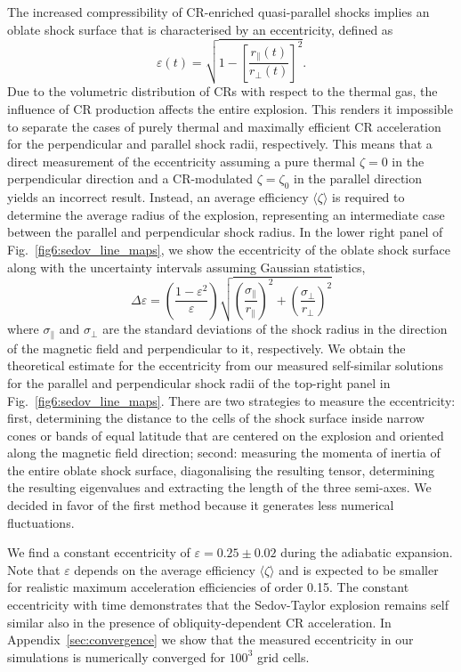 \documentclass[8pt,a4paper,usenatbib]{mnras}
\renewcommand{\epsilon}{\varepsilon}
\begin{document}
The increased compressibility of CR-enriched quasi-parallel shocks implies an
oblate shock surface that is characterised by an eccentricity, defined as
\begin{equation}
\epsilon(t) = \sqrt{1 - \left[\dfrac{r_\|(t)}{r_\bot (t)}\right]^2}.
\end{equation}
Due to the volumetric distribution of CRs with respect to the thermal gas, the
influence of CR production affects the entire explosion. This renders it
impossible to separate the cases of purely thermal and maximally efficient CR
acceleration for the perpendicular and parallel shock radii, respectively. This
means that a direct measurement of the eccentricity assuming a pure thermal
$\zeta = 0$ in the perpendicular direction and a CR-modulated $\zeta = \zeta_0$
in the parallel direction yields an incorrect result. Instead, an average
efficiency $\langle \zeta \rangle$ is required to determine the average radius
of the explosion, representing an intermediate case between the parallel and
perpendicular shock radius. In the lower right panel of
Fig.~\ref{fig6:sedov_line_maps}, we show the eccentricity of the oblate shock
surface along with the uncertainty intervals assuming Gaussian statistics,
\begin{equation}
  \Delta \epsilon = \left( \dfrac{1- \epsilon^2}{\epsilon}\right)
  \sqrt{\left( \dfrac{\sigma_\parallel}{r_\parallel}\right)^2 + 
    \left( \dfrac{\sigma_\perp}{r_\perp}\right)^2}
\end{equation}
where $\sigma_\parallel$ and $\sigma_\perp$ are the standard deviations of the
shock radius in the direction of the magnetic field and perpendicular to it,
respectively. We obtain the theoretical estimate for the eccentricity from our
measured self-similar solutions for the parallel and perpendicular shock radii
of the top-right panel in Fig.~\ref{fig6:sedov_line_maps}.  There are two
strategies to measure the eccentricity: first, determining the distance to the
cells of the shock surface inside narrow cones or bands of equal latitude that
are centered on the explosion and oriented along the magnetic field direction;
second: measuring the momenta of inertia of the entire oblate shock surface,
diagonalising the resulting tensor, determining the resulting eigenvalues and
extracting the length of the three semi-axes. We decided in favor of the first
method because it generates less numerical fluctuations.


We find a constant eccentricity of $\epsilon = 0.25 \pm 0.02$ during the adiabatic
expansion. Note that $\epsilon$ depends on the average efficiency
$\langle\zeta\rangle$ and is expected to be smaller for realistic maximum
acceleration efficiencies of order 0.15. The constant eccentricity with time
demonstrates that the Sedov-Taylor explosion remains self similar also in the
presence of obliquity-dependent CR acceleration.  In
Appendix~\ref{sec:convergence} we show that the measured eccentricity in our
simulations is numerically converged for $100^3$ grid cells.
\end{document}
